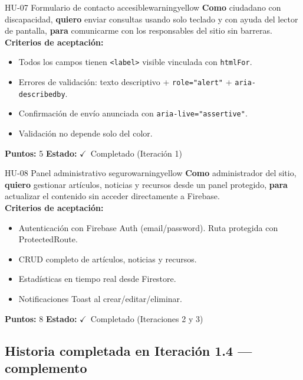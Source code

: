 \documentclass[12pt, a4paper]{article}
\newcommand{\cmark}{\textcolor{successgreen}{$\checkmark$}}
\begin{document}
\begin{storybox}{HU-07 \quad Formulario de contacto accesible}{warningyellow}
\textbf{Como} ciudadano con discapacidad,
\textbf{quiero} enviar consultas usando solo teclado y con ayuda del lector de pantalla,
\textbf{para} comunicarme con los responsables del sitio sin barreras.\\[4pt]
\textbf{Criterios de aceptación:}
\begin{itemize}
  \item Todos los campos tienen \texttt{<label>} visible vinculada con \texttt{htmlFor}.
  \item Errores de validación: texto descriptivo + \texttt{role="alert"} + \texttt{aria-describedby}.
  \item Confirmación de envío anunciada con \texttt{aria-live="assertive"}.
  \item Validación no depende solo del color.
\end{itemize}
\textbf{Puntos:} 5 \quad \textbf{Estado:} \cmark~Completado (Iteración 1)
\end{storybox}

\begin{storybox}{HU-08 \quad Panel administrativo seguro}{warningyellow}
\textbf{Como} administrador del sitio,
\textbf{quiero} gestionar artículos, noticias y recursos desde un panel protegido,
\textbf{para} actualizar el contenido sin acceder directamente a Firebase.\\[4pt]
\textbf{Criterios de aceptación:}
\begin{itemize}
  \item Autenticación con Firebase Auth (email/password). Ruta protegida con ProtectedRoute.
  \item CRUD completo de artículos, noticias y recursos.
  \item Estadísticas en tiempo real desde Firestore.
  \item Notificaciones Toast al crear/editar/eliminar.
\end{itemize}
\textbf{Puntos:} 8 \quad \textbf{Estado:} \cmark~Completado (Iteraciones 2 y 3)
\end{storybox}

\subsection{Historia completada en Iteración 1.4 --- complemento}
\end{document}
